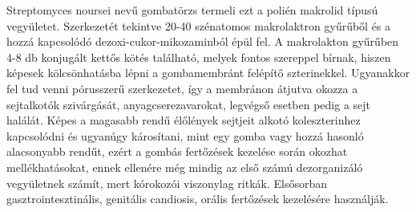 {Streptomyces noursei nevű gombatörzs termeli ezt a polién makrolid típusú vegyületet. Szerkezetét tekintve 20-40 szénatomos makrolaktron gyűrűből és a hozzá kapcsolódó dezoxi-cukor-mikozaminból épül fel. A makrolakton gyűrűben 4-8 db konjugált kettős kötés található, melyek fontos szereppel bírnak, hiszen képesek kölcsönhatásba lépni a gombamembránt felépítő szterinekkel. Ugyanakkor fel tud venni pórusszerű szerkezetet, így a membránon átjutva okozza a sejtalkotók szivárgását, anyagcserezavarokat, legvégső esetben pedig a sejt halálát. Képes a magasabb rendű élőlények sejtjeit alkotó koleszterinhez kapcsolódni és ugyanúgy károsítani, mint egy gomba vagy hozzá hasonló alacsonyabb rendűt, ezért a gombás fertőzések kezelése során okozhat mellékhatásokat, ennek ellenére még mindig az első számú dezorganizáló vegyületnek számít, mert kórokozói viszonylag ritkák. Elsősorban gasztrointesztinális, genitális candiosis, orális fertőzések kezelésére használják.

}
